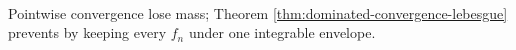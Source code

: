 \begin{perspective} \label{per:domination-as-limit-integral-safeguard} \\
Pointwise convergence lose mass; Theorem \ref{thm:dominated-convergence-lebesgue} prevents by keeping every $f_n$ under one integrable envelope.
\end{perspective}
